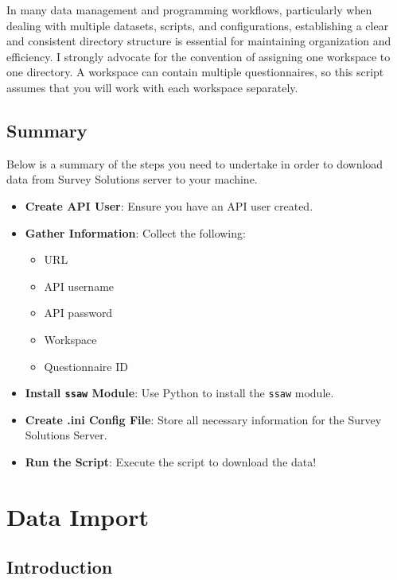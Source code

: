 \documentclass[
  letterpaper,
  DIV=11,
  numbers=noendperiod]{scrreprt}
\providecommand{\tightlist}{%
  \setlength{\itemsep}{0pt}\setlength{\parskip}{0pt}}\usepackage{longtable,booktabs,array}
\begin{document}
In many data management and programming workflows, particularly when
dealing with multiple datasets, scripts, and configurations,
establishing a clear and consistent directory structure is essential for
maintaining organization and efficiency. I strongly advocate for the
convention of assigning one workspace to one directory. A workspace can
contain multiple questionnaires, so this script assumes that you will
work with each workspace separately.

\section{Summary}\label{summary}

Below is a summary of the steps you need to undertake in order to
download data from Survey Solutions server to your machine.

\begin{itemize}
\tightlist
\item
  \textbf{Create API User}: Ensure you have an API user created.
\item
  \textbf{Gather Information}: Collect the following:

  \begin{itemize}
  \item
    URL
  \item
    API username
  \item
    API password
  \item
    Workspace
  \item
    Questionnaire ID
  \end{itemize}
\item
  \textbf{Install \texttt{ssaw} Module}: Use Python to install the
  \texttt{ssaw} module.
\item
  \textbf{Create .ini Config File}: Store all necessary information for
  the Survey Solutions Server.
\item
  \textbf{Run the Script}: Execute the script to download the data!
\end{itemize}


\chapter{Data Import}\label{data-import}

\section{Introduction}\label{introduction-2}
\end{document}

